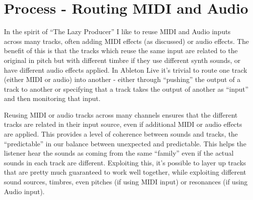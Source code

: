 \documentclass[
  12pt,
  letterpaper,
  oneside,
  open=any]{scrbook}
\makeatletter
\newcommand*\pandocbounded[1]{%
  \sbox\pandoc@box{#1}%
  \Gscale@div\@tempa{\textheight}{\dimexpr\ht\pandoc@box+\dp\pandoc@box\relax}%
  \Gscale@div\@tempb{\linewidth}{\wd\pandoc@box}%
  \ifdim\@tempb\p@<\@tempa\p@\let\@tempa\@tempb\fi%
  \ifdim\@tempa\p@<\p@\scalebox{\@tempa}{\usebox\pandoc@box}%
  \else\usebox{\pandoc@box}%
  \fi%
}
\makeatother
\begin{document}
\pandocbounded{\texttt{[image: images/Nordmann\_chord.png]}}


\chapter{Process - Routing MIDI and
Audio}\label{Chapter-005-Process-Routing}

In the spirit of ``The Lazy Producer'' I like to reuse MIDI and Audio
inputs across many tracks, often adding MIDI effects (as discussed) or
audio effects. The benefit of this is that the tracks which reuse the
same input are related to the original in pitch but with different
timbre if they use different synth sounds, or have different audio
effects applied. In Ableton Live it's trivial to route one track (either
MIDI or audio) into another - either through ``pushing'' the output of a
track to another or specifying that a track takes the output of another
as ``input'' and then monitoring that input.

\begin{tcolorbox}[enhanced jigsaw, titlerule=0mm, toprule=.15mm, bottomrule=.15mm, colframe=quarto-callout-tip-color-frame, bottomtitle=1mm, opacityback=0, breakable, leftrule=.75mm, coltitle=black, colback=white, rightrule=.15mm, arc=.35mm, toptitle=1mm, title=\textcolor{quarto-callout-tip-color}{\faLightbulb}\hspace{0.5em}{Key idea}, opacitybacktitle=0.6, left=2mm, colbacktitle=quarto-callout-tip-color!10!white]

Reusing MIDI or audio tracks across many channels ensures that the
different tracks are related in their input source, even if additional
MIDI or audio effects are applied. This provides a level of coherence
between sounds and tracks, the ``predictable'' in our balance between
unexpected and predictable. This helps the listener hear the sounds as
coming from the same ``family'' even if the actual sounds in each track
are different. Exploiting this, it's possible to layer up tracks that
are pretty much guaranteed to work well together, while exploiting
different sound sources, timbres, even pitches (if using MIDI input) or
resonances (if using Audio input).

\end{tcolorbox}
\end{document}
